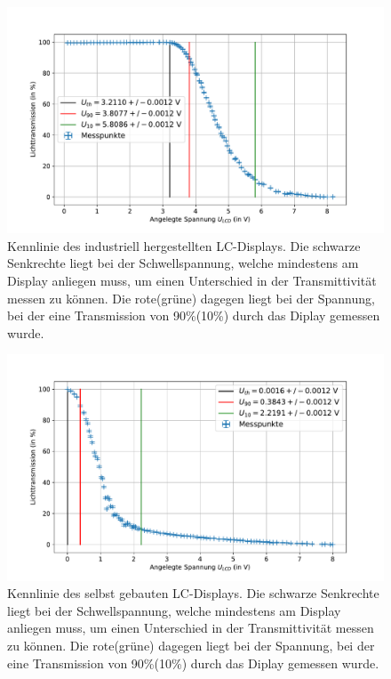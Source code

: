 \documentclass[
	a4paper,
	12pt,
	pagesize,
	ngerman
]{scrartcl}
\begin{document}
	\begin{figure}[H]
			\includegraphics[width=1\linewidth]{images/industry.pdf}
			\caption{Kennlinie des industriell hergestellten LC-Displays.
			Die schwarze Senkrechte liegt bei der Schwellspannung, welche mindestens am Display anliegen muss, um einen Unterschied in der Transmittivität messen zu können.
			Die rote(grüne) dagegen liegt bei der Spannung, bei der eine Transmission von 90\%(10\%) durch das Diplay gemessen wurde.
			}
			\label{fig_industry}
	\end{figure}
	\begin{figure}[H]
			\includegraphics[width=1\linewidth]{images/selfmade.pdf}
			\caption{Kennlinie des selbst gebauten LC-Displays.
			Die schwarze Senkrechte liegt bei der Schwellspannung, welche mindestens am Display anliegen muss, um einen Unterschied in der Transmittivität messen zu können.
			Die rote(grüne) dagegen liegt bei der Spannung, bei der eine Transmission von 90\%(10\%) durch das Diplay gemessen wurde.
			}
			\label{fig_selfmade}
	\end{figure}
\end{document}
